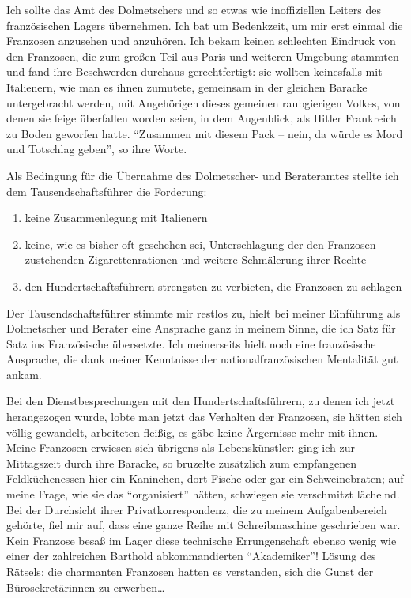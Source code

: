 Ich sollte das Amt des Dolmetschers und so etwas wie inoffiziellen Leiters des französischen Lagers übernehmen. Ich bat um Bedenkzeit, um mir erst einmal die Franzosen anzusehen und anzuhören. Ich bekam keinen schlechten Eindruck von den Franzosen, die zum großen Teil aus Paris und weiteren Umgebung stammten und fand ihre Beschwerden durchaus gerechtfertigt: sie wollten keinesfalls mit Italienern, wie man es ihnen zumutete, gemeinsam in der gleichen Baracke untergebracht werden, mit Angehörigen dieses gemeinen raubgierigen Volkes, von denen sie feige überfallen worden seien, in dem Augenblick, als Hitler Frankreich zu Boden geworfen hatte. \enquote{Zusammen mit diesem Pack -- nein, da würde es Mord und Totschlag geben}, so ihre Worte.

Als Bedingung für die Übernahme des Dolmetscher- und Berateramtes stellte ich dem Tausendschaftsführer die Forderung:

\begin{enumerate}
	\item keine Zusammenlegung mit Italienern
	\item keine, wie es bisher oft geschehen sei, Unterschlagung der den Franzosen zustehenden Zigarettenrationen und weitere Schmälerung ihrer Rechte
	\item den Hundertschaftsführern strengsten zu verbieten, die Franzosen zu schlagen
\end{enumerate}

Der Tausendschaftsführer stimmte mir restlos zu, hielt bei meiner Einführung als Dolmetscher und Berater eine Ansprache ganz in meinem Sinne, die ich Satz für Satz ins Französische  übersetzte. Ich meinerseits hielt noch eine französische Ansprache, die dank meiner Kenntnisse der nationalfranzösischen Mentalität gut ankam.

Bei den Dienstbesprechungen mit den Hundertschaftsführern, zu denen ich jetzt herangezogen wurde, lobte man jetzt das Verhalten der Franzosen, sie hätten sich völlig gewandelt, arbeiteten fleißig, es gäbe keine Ärgernisse mehr mit ihnen. Meine Franzosen erwiesen sich übrigens als Lebenskünstler: ging ich zur Mittagszeit durch ihre Baracke, so bruzelte zusätzlich zum empfangenen Feldküchenessen hier ein Kaninchen, dort Fische oder gar ein Schweinebraten; auf meine Frage, wie sie das \enquote{organisiert} hätten, schwiegen sie verschmitzt lächelnd. Bei der Durchsicht ihrer Privatkorrespondenz, die zu meinem Aufgabenbereich gehörte, fiel mir auf, dass eine ganze Reihe mit Schreibmaschine geschrieben war. Kein Franzose besaß im Lager diese technische Errungenschaft ebenso wenig wie einer der zahlreichen Barthold abkommandierten \enquote{Akademiker}! Lösung des Rätsels: die charmanten Franzosen hatten es verstanden, sich die Gunst der Bürosekretärinnen zu erwerben\dots

